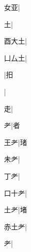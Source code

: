 \begin{multicols}{2}
{{\cjk{}{\cnsym{}　}女亚}\mktsJzrVerticalBar{}{\cjk{}{\cnsym{}　}{\cnsym{}　}{\cnsym{}　}}|{}\par
{\cjk{}{\cnsym{}　}{\cnsym{}　}土}\mktsJzrVerticalBar{}{\cjk{}{\cnsym{}　}{\cnsym{}　}{\cnsym{}　}}|{}\par
{\cjk{}酉大土}\mktsJzrVerticalBar{}{\cjk{}{\cnsym{}　}{\cnsym{}　}{\cnsym{}　}}|{}\par
{\cjk{}凵厶土}|{}\par
{}\mktsJzrVerticalBar{}{\cjk{}{\cnsym{}　}{\cnsym{}　}{\cnsym{}　}}|{\cjk{}抇}\par
{}\mktsJzrVerticalBar{}{\cjk{}{\cnsym{}　}{\cnsym{}　}{\cnsym{}　}}|{}\par
{\cjk{}{\cnsym{}　}{\cnsym{}　}走}\mktsJzrVerticalBar{}{\cjk{}{\cnsym{}　}{\cnsym{}　}{\cnsym{}　}}|{}\par
{\cjk{}{\cnsym{}　}{\cnsym{}　}耂}\mktsJzrVerticalBar{}{\cjk{}{\cnsym{}　}{\cnsym{}　}{\cnsym{}　}}|{\cjk{}者}\par
{\cjk{}{\cnsym{}　}王耂}\mktsJzrVerticalBar{}{\cjk{}{\cnsym{}　}{\cnsym{}　}{\cnsym{}　}}|{\cjk{}琽}\par
{\cjk{}{\cnsym{}　}未耂}\mktsJzrVerticalBar{}{\cjk{}{\cnsym{}　}{\cnsym{}　}{\cnsym{}　}}|{}\par
{丁耂}\mktsJzrVerticalBar{}{\cjk{}{\cnsym{}　}{\cnsym{}　}{\cnsym{}　}}|{}\par
{\cjk{}口十耂}|{}\par
{\cjk{}{\cnsym{}　}土耂}\mktsJzrVerticalBar{}{\cjk{}{\cnsym{}　}{\cnsym{}　}{\cnsym{}　}}|{\cjk{}堵}\par
{\cjk{}赤土耂}\mktsJzrVerticalBar{}{\cjk{}{\cnsym{}　}{\cnsym{}　}{\cnsym{}　}}|{}\par
{耂}\mktsJzrVerticalBar{}{\cjk{}{\cnsym{}　}{\cnsym{}　}{\cnsym{}　}}|{}\par
}
\end{multicols}
